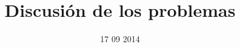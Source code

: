 \documentclass[a4paper,12pt]{book}
\begin{document}
\author{}
\title{Discusión de los problemas}
\date{17 09 2014}

\frontmatter
\maketitle
\tableofcontents

\mainmatter


\backmatter
\end{document}
